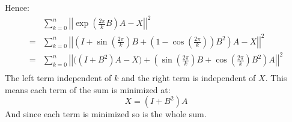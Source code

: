 Hence:
\begin{equation*}
\begin{aligned}
&\sum_{k=0}^n\left|\left|\exp\left(\frac{2\pi}{k}B\right)A-X\right|\right|^2\\
=&\sum_{k=0}^n\left|\left|\left(I+\sin\left(\frac{2\pi}{k}\right)B+\left(1-\cos\left(\frac{2\pi}{k}\right)\right)B^2\right)A-X\right|\right|^2\\
=&\sum_{k=0}^n\left|\left|\bigg((I+B^2)A-X\bigg)+\left(\sin\left(\frac{2\pi}{k}\right)B+\cos\left(\frac{2\pi}{k}\right)B^2\right)A\right|\right|^2\\
\end{aligned}
\end{equation*}
The left term independent of $k$ and the right term is independent of $X$.
This means each term of the sum is minimized at:
\[X=(I+B^2)A\]
And since each term is minimized so is the whole sum.
